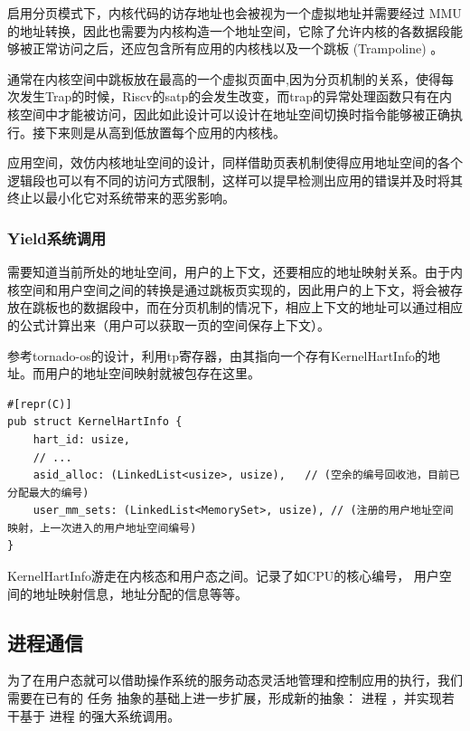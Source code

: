 启用分页模式下，内核代码的访存地址也会被视为一个虚拟地址并需要经过 MMU 的地址转换，因此也需要为内核构造一个地址空间，它除了允许内核的各数据段能够被正常访问之后，还应包含所有应用的内核栈以及一个跳板 (Trampoline) 。

通常在内核空间中跳板放在最高的一个虚拟页面中,因为分页机制的关系，使得每次发生Trap的时候，Riscv的satp的会发生改变，而trap的异常处理函数只有在内核空间中才能被访问，因此如此设计可以设计在地址空间切换时指令能够被正确执行。接下来则是从高到低放置每个应用的内核栈。

应用空间，效仿内核地址空间的设计，同样借助页表机制使得应用地址空间的各个逻辑段也可以有不同的访问方式限制，这样可以提早检测出应用的错误并及时将其终止以最小化它对系统带来的恶劣影响。

\subsubsection{Yield系统调用}

需要知道当前所处的地址空间，用户的上下文，还要相应的地址映射关系。由于内核空间和用户空间之间的转换是通过跳板页实现的，因此用户的上下文，将会被存放在跳板也的数据段中，而在分页机制的情况下，相应上下文的地址可以通过相应的公式计算出来（用户可以获取一页的空间保存上下文）。

参考tornado-os的设计，利用tp寄存器，由其指向一个存有KernelHartInfo的地址。而用户的地址空间映射就被包存在这里。

\begin{lstlisting}[caption=KernelHartInfo的结构]
#[repr(C)]
pub struct KernelHartInfo {
    hart_id: usize,
    // ...
    asid_alloc: (LinkedList<usize>, usize),   // (空余的编号回收池，目前已分配最大的编号)
    user_mm_sets: (LinkedList<MemorySet>, usize), // (注册的用户地址空间映射，上一次进入的用户地址空间编号)
}
\end{lstlisting}

KernelHartInfo游走在内核态和用户态之间。记录了如CPU的核心编号， 用户空间的地址映射信息，地址分配的信息等等。

\subsection{进程通信}

为了在用户态就可以借助操作系统的服务动态灵活地管理和控制应用的执行，我们需要在已有的 任务 抽象的基础上进一步扩展，形成新的抽象： 进程 ，并实现若干基于 进程 的强大系统调用。

